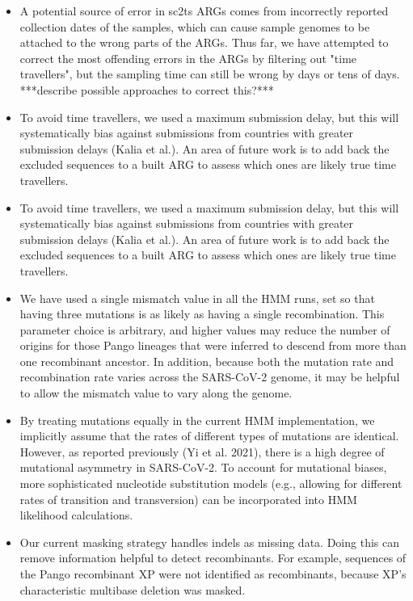 \documentclass{article}
\begin{document}
\begin{itemize}
\item A potential source of error in sc2ts ARGs comes from
incorrectly reported collection dates of the samples, which can cause sample
genomes to be attached to the wrong parts of the ARGs. Thus far, we have
attempted to correct the most offending errors in the ARGs by filtering out
"time travellers", but the sampling time can still be wrong by days or tens of
days. ***describe possible approaches to correct this?***
\item To avoid time
travellers, we used a maximum submission delay, but this will systematically
bias against submissions from countries with greater submission delays (Kalia
et al.). An area of future work is to add back the excluded sequences to a
built ARG to assess which ones are likely true time travellers.
\item To avoid
time travellers, we used a maximum submission delay, but this will
systematically bias against submissions from countries with greater submission
delays (Kalia et al.). An area of future work is to add back the excluded
sequences to a built ARG to assess which ones are likely true time travellers.
\item We have used a single mismatch value in all the HMM runs, set so that
having three mutations is as likely as having a single recombination. This
parameter choice is arbitrary, and higher values may reduce the number of
origins for those Pango lineages that were inferred to descend from more than
one recombinant ancestor. In addition, because both the mutation rate and
recombination rate varies across the SARS-CoV-2 genome, it may be helpful to
allow the mismatch value to vary along the genome.
\item By treating mutations
equally in the current HMM implementation, we implicitly assume that the rates
of different types of mutations are identical. However, as reported previously
(Yi et al. 2021), there is a high degree of mutational asymmetry in SARS-CoV-2.
To account for mutational biases, more sophisticated nucleotide substitution
models (e.g., allowing for different rates of transition and transversion) can
be incorporated into HMM likelihood calculations.
\item Our current masking
strategy handles indels as missing data. Doing this can remove information
helpful to detect recombinants. For example, sequences of the Pango recombinant
XP were not identified as recombinants, because XP’s characteristic multibase
deletion was masked.

\end{itemize}
\end{document}
